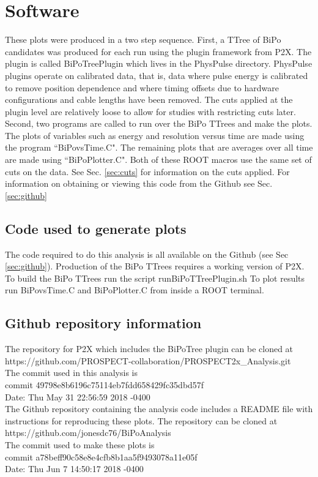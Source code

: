 \section{Software}
These plots were produced in a two step sequence. First, a TTree of BiPo candidates was produced for each run using the plugin framework from P2X. The plugin is called BiPoTreePlugin which lives in the PhysPulse directory. PhysPulse plugins operate on calibrated data, that is, data where pulse energy is calibrated to remove position dependence and where timing offsets due to hardware configurations and cable lengths have been removed. The cuts applied at the plugin level are relatively loose to allow for studies with restricting cuts later. Second, two programs are called to run over the BiPo TTrees and make the plots. The plots of variables such as energy and resolution versus time are made using the program ``BiPovsTime.C". The remaining plots that are averages over all time are made using ``BiPoPlotter.C".  Both of these ROOT macros use the same set of cuts on the data. See Sec. \ref{sec:cuts} for information on the cuts applied. For information on obtaining or viewing this code from the Github see Sec. \ref{sec:github} 
\subsection{Code used to generate plots}
The code required to do this analysis is all available on the Github (see Sec \ref{sec:github}). Production of the BiPo TTrees requires a working version of P2X. 
To build the BiPo TTrees run the script runBiPoTTreePlugin.sh
To plot results run BiPovsTime.C and BiPoPlotter.C from inside a ROOT terminal. 
\subsection{Github repository information\label{sec:github}}
The repository for P2X which includes the BiPoTree plugin can be cloned at\\ https://github.com/PROSPECT-collaboration/PROSPECT2x\_Analysis.git\\
The commit used in this analysis is \\
commit 49798e8b6196c75114eb7fdd658429fc35dbd57f\\
Date:   Thu May 31 22:56:59 2018 -0400\\

The Github repository containing the analysis code includes a README file with instructions for reproducing these plots. The repository can be cloned at \\
https://github.com/jonesdc76/BiPoAnalysis\\
The commit used to make these plots is\\
commit a78beff90c58e8e4cfb8b1aa5f9493078a11e05f\\
Date:   Thu Jun 7 14:50:17 2018 -0400
\newpage
